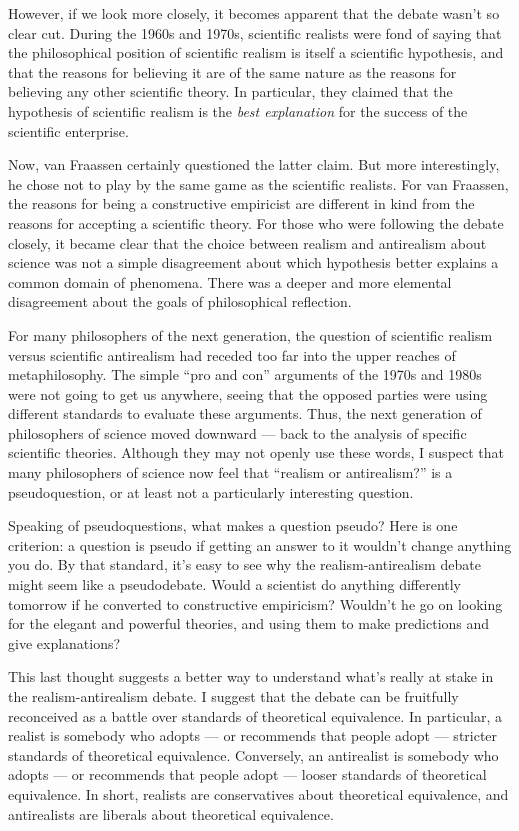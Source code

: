 However, if we look more closely, it becomes apparent that the debate
wasn't so clear cut.  During the 1960s and 1970s, scientific realists
were fond of saying that the philosophical position of scientific
realism is itself a scientific hypothesis, and that the reasons for
believing it are of the same nature as the reasons for believing any
other scientific theory.  In particular, they claimed that the
hypothesis of scientific realism is the {\it best explanation} for the
success of the scientific enterprise.

Now, van Fraassen certainly questioned the latter claim.  But more
interestingly, he chose not to play by the same game as the scientific
realists.  For van Fraassen, the reasons for being a constructive
empiricist are different in kind from the reasons for accepting a
scientific theory.  For those who were following the debate closely,
it became clear that the choice between realism and antirealism about
science was not a simple disagreement about which hypothesis better
explains a common domain of phenomena.  There was a deeper and more
elemental disagreement about the goals of philosophical reflection.

For many philosophers of the next generation, the question of
scientific realism versus scientific antirealism had receded too far
into the upper reaches of metaphilosophy.  The simple ``pro and con''
arguments of the 1970s and 1980s were not going to get us anywhere,
seeing that the opposed parties were using different standards to
evaluate these arguments.  Thus, the next generation of philosophers
of science moved downward --- back to the analysis of specific
scientific theories.  Although they may not openly use these words, I
suspect that many philosophers of science now feel that ``realism or
antirealism?'' is a pseudoquestion, or at least not a particularly
interesting question.

Speaking of pseudoquestions, what makes a question pseudo?  Here is
one criterion: a question is pseudo if getting an answer to it
wouldn't change anything you do.  By that standard, it's easy to see
why the realism-antirealism debate might seem like a pseudodebate.
Would a scientist do anything differently tomorrow if he converted to
constructive empiricism?  Wouldn't he go on looking for the elegant
and powerful theories, and using them to make predictions and give
explanations?

This last thought suggests a better way to understand what's really at
stake in the realism-antirealism debate.  I suggest that the debate
can be fruitfully reconceived as a battle over standards of
theoretical equivalence.  In particular, a realist is somebody who
adopts --- or recommends that people adopt --- stricter standards of
theoretical equivalence.  Conversely, an antirealist is somebody who
adopts --- or recommends that people adopt --- looser standards of
theoretical equivalence.  In short, realists are conservatives about
theoretical equivalence, and antirealists are liberals about
theoretical equivalence.

